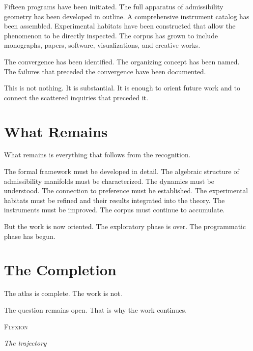 \documentclass[12pt, openany]{book}
\begin{document}
Fifteen programs have been initiated. The full apparatus of admissibility
geometry has been developed in outline. A comprehensive instrument catalog
has been assembled. Experimental habitats have been constructed that allow
the phenomenon to be directly inspected. The corpus has grown to include
monographs, papers, software, visualizations, and creative works.

The convergence has been identified. The organizing concept has been named.
The failures that preceded the convergence have been documented.

This is not nothing. It is substantial. It is enough to orient future work
and to connect the scattered inquiries that preceded it.

\section{What Remains}

What remains is everything that follows from the recognition.

The formal framework must be developed in detail. The algebraic structure
of admissibility manifolds must be characterized. The dynamics must be
understood. The connection to preference must be established. The
experimental habitats must be refined and their results integrated into
the theory. The instruments must be improved. The corpus must continue
to accumulate.

But the work is now oriented. The exploratory phase is over. The
programmatic phase has begun.

\section{The Completion}

The atlas is complete. The work is not.

\medskip

\noindent The question remains open. That is why the work continues.

\bigskip

\begin{center}
\textsc{Flyxion}

\medskip

\textit{The trajectory}
\end{center}

\cleardoublepage

\pagestyle{plain}
\end{document}
